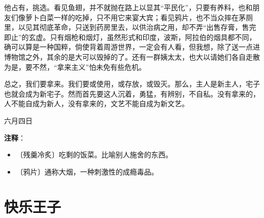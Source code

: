 \documentclass[12pt,UTF-8,openany]{ctexbook}
\begin{document}
\begin{normalsize}
    他占有，挑选。看见鱼翅，并不就抛在路上以显其“平民化”，只要有养料，也和朋友们像萝卜白菜一样的吃掉，只不用它来宴大宾；看见鸦片，也不当众摔在茅厕里，以见其彻底革命，只送到药房里去，以供治病之用，却不弄“出售存膏，售完即止”的玄虚。只有烟枪和烟灯，虽然形式和印度，波斯，阿拉伯的烟具都不同，确可以算是一种国粹，倘使背着周游世界，一定会有人看，但我想，除了送一点进博物馆之外，其余的是大可以毁掉的了。还有一群姨太太，也大以请她们各自走散为是，要不然，“拿来主义”怕未免有些危机。
    
    总之，我们要拿来。我们要或使用，或存放，或毁灭。那么，主人是新主人，宅子也就会成为新宅子。然而首先要这人沉着，勇猛，有辨别，不自私。没有拿来的，人不能自成为新人，没有拿来的，文艺不能自成为新文艺。
    
    \hfill 六月四日
    
\end{normalsize}


\newpage

\textbf{注释}：

\vspace{-1em}

\begin{itemize}
    \setlength\itemsep{-0.2em}
    \item 〔残羹冷炙〕吃剩的饭菜。比喻别人施舍的东西。
    \item 〔鸦片〕通称大烟，一种刺激性的成瘾毒品。
\end{itemize}

\chapter{快乐王子}
\end{document}
